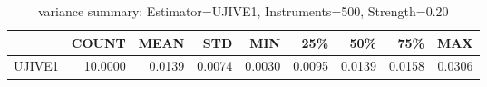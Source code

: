 \begin{table}[ht]
\centering
\caption{variance summary: Estimator=UJIVE1, Instruments=500, Strength=0.20}
\begin{tabular}{lrrrrrrrr}
\toprule
 & COUNT & MEAN & STD & MIN & 25\% & 50\% & 75\% & MAX \\
\midrule
UJIVE1 & 10.0000 & 0.0139 & 0.0074 & 0.0030 & 0.0095 & 0.0139 & 0.0158 & 0.0306 \\
\bottomrule
\end{tabular}
\end{table}
